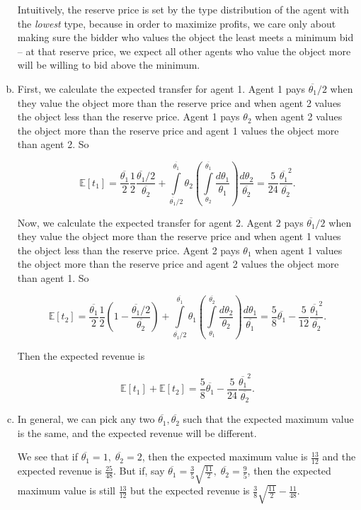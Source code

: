 \documentclass{article}
\begin{document}
\begin{enumerate}[(a)]
	Intuitively, the reserve price is set by the type distribution of the agent with the \textit{lowest} type, because in order to maximize profits, we care only about making sure the bidder who values the object the least meets a minimum bid -- at that reserve price, we expect all other agents who value the object more will be willing to bid above the minimum.

	\item

	First, we calculate the expected transfer for agent 1. Agent 1 pays $\overline{\theta_1}/2$ when they value the object more than the reserve price and when agent 2 values the object less than the reserve price. Agent 1 pays $\theta_2$ when agent 2 values the object more than the reserve price and agent 1 values the object more than agent 2. So

	$$\mathbb{E}[t_1] = \frac{\overline{\theta_1}}{2} \frac{1}{2} \frac{\overline{\theta_1}/2}{\overline{\theta_2}} + \int \limits_{\overline{\theta_1}/2}^{\overline{\theta_1}} \theta_2 \left( \int \limits_{\theta_2}^{\overline{\theta_1}} \frac{d\theta_1}{\theta_1} \right) \frac{d\theta_2}{\overline{\theta_2}} = \frac{5}{24} \frac{\overline{\theta_1}^2}{\overline{\theta_2}}.$$

	Now, we calculate the expected transfer for agent 2. Agent 2 pays $\overline{\theta_1}/2$ when they value the object more than the reserve price and when agent 1 values the object less than the reserve price. Agent 2 pays $\theta_1$ when agent 1 values the object more than the reserve price and agent 2 values the object more than agent 1. So

	$$\mathbb{E}[t_2] = \frac{\overline{\theta_1}}{2} \frac{1}{2} \left( 1 - \frac{\overline{\theta_1}/2}{\overline{\theta_2}} \right) + \int \limits_{\overline{\theta_1}/2}^{\overline{\theta_1}} \theta_1 \left( \int \limits_{\theta_1}^{\overline{\theta_2}} \frac{d\theta_2}{\theta_2} \right) \frac{d \theta_1}{\overline{\theta_1}} = \frac{5}{8} \overline{\theta_1} - \frac{5}{12} \frac{\overline{\theta_1}^2}{\overline{\theta_2}}.$$

	Then the expected revenue is 

	$$\mathbb{E}[t_1] + \mathbb{E}[t_2] =  \frac{5}{8} \overline{\theta_1} - \frac{5}{24} \frac{\overline{\theta_1}^2}{\overline{\theta_2}}.$$

	\item

	In general, we can pick any two $\overline{\theta_1}, \overline{\theta_2}$ such that the expected maximum value is the same, and the expected revenue will be different.

	We see that if $\overline{\theta_1} = 1, \; \overline{\theta_2} = 2$, then the expected maximum value is $\frac{13}{12}$ and the expected revenue is $\frac{25}{48}$. But if, say $\overline{\theta_1} = \frac{3}{5} \sqrt{\frac{11}{2}}, \; \overline{\theta_2} = \frac{9}{5}$, then the expected maximum value is still $\frac{13}{12}$ but the expected revenue is $\frac{3}{8}\sqrt{\frac{11}{2}} - \frac{11}{48}$.

\end{enumerate}
\end{document}
